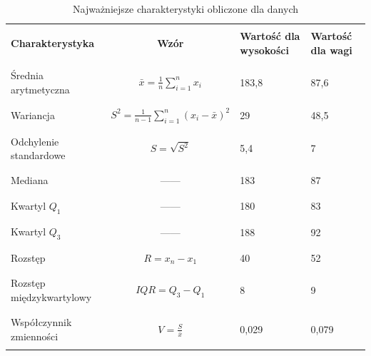 \documentclass[12pt]{mwart}
\begin{document}
	\begin{table}[H]
		\centering
		\begin{tabular}{| m{3.4cm} | c | m{2cm} | m{2cm} |}
			\hline & & & \\[-1em]
			\textbf{Charakterystyka} & \textbf{Wzór} & \textbf{Wartość dla \mbox{wysokości}} & \textbf{Wartość dla wagi}
			\\[-1em] & & & \\\hline & & & \\[-1em]
			Średnia \mbox{arytmetyczna} & $\bar{x}=\frac{1}{n}\sum\limits_{i=1}^{n}x_i$ & 183,8 & 87,6 
			\\[-1em] & & & \\\hline & & & \\[-1em]
			Wariancja & $S^2=\frac{1}{n-1}\sum\limits_{i=1}^{n}(x_i-\bar{x})^2$ & 29 & 48,5
			\\[-1em] & & & \\\hline & & & \\[-1em]
			Odchylenie \mbox{standardowe} & $S=\sqrt{S^2}$ & 5,4 & 7
			\\[-1em] & & & \\\hline & & & \\[-1em]
			Mediana & ------ & 183 & 87
			\\[-1em] & & & \\\hline & & & \\[-1em]
			Kwartyl $Q_1$ & ------ & 180 & 83
			\\[-1em] & & & \\\hline & & & \\[-1em]
			Kwartyl $Q_3$ & ------ & 188 & 92
			\\[-1em] & & & \\\hline & & & \\[-1em]
			Rozstęp & $R = x_n - x_1$ & 40 & 52
			\\[-1em] & & & \\\hline & & & \\[-1em]
			Rozstęp międzykwartylowy & $IQR = Q_3 - Q_1$ & 8 & 9
			\\[-1em] & & & \\\hline & & & \\[-1em]
			Współczynnik zmienności & $V=\frac{S}{\bar{x}}$ & 0,029 & 0,079
			\\[-1em] & & & \\\hline
		\end{tabular}
		\caption{Najważniejsze charakterystyki obliczone dla danych}
	\end{table}
\end{document}
